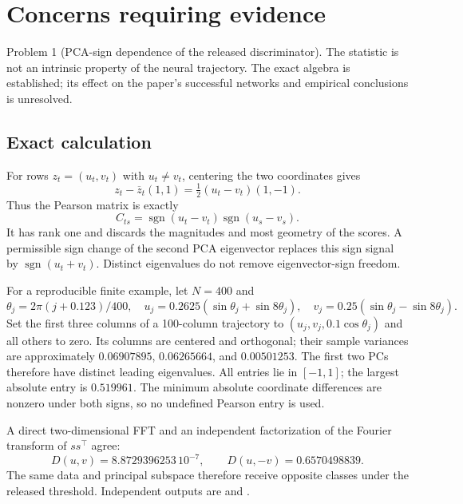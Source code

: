 \documentclass[10pt]{article}
\begin{document}
\section*{Concerns requiring evidence}
Problem 1 (PCA-sign dependence of the released discriminator).  The statistic is not an intrinsic property of the neural trajectory. The exact algebra is established; its effect on the paper’s successful networks and empirical conclusions is unresolved.\par
\subsection*{Exact calculation}
For rows \(z_t=(u_t,v_t)\) with \(u_t\ne v_t\), centering the two coordinates gives \[z_t-\overline z_t(1,1)
=\tfrac12(u_t-v_t)(1,-1).\] Thus the Pearson matrix is exactly \[C_{ts}=\operatorname{sgn}(u_t-v_t)
        \operatorname{sgn}(u_s-v_s).\] It has rank one and discards the magnitudes and most geometry of the scores. A permissible sign change of the second PCA eigenvector replaces this sign signal by \(\operatorname{sgn}(u_t+v_t)\). Distinct eigenvalues do not remove eigenvector-sign freedom.\par
For a reproducible finite example, let \(N=400\) and \[\theta_j=2\pi(j+0.123)/400,\quad
u_j=0.2625(\sin\theta_j+\sin8\theta_j),\quad
v_j=0.25(\sin\theta_j-\sin8\theta_j).\] Set the first three columns of a 100-column trajectory to \((u_j,v_j,0.1\cos\theta_j)\) and all others to zero. Its columns are centered and orthogonal; their sample variances are approximately \(0.06907895\), \(0.06265664\), and \(0.00501253\). The first two PCs therefore have distinct leading eigenvalues. All entries lie in \([-1,1]\); the largest absolute entry is \(0.519961\). The minimum absolute coordinate differences are nonzero under both signs, so no undefined Pearson entry is used.\par
A direct two-dimensional FFT and an independent factorization of the Fourier transform of \(ss^\top\) agree: \[D(u,v)=8.8729396253\,10^{-7},\qquad
D(u,-v)=0.6570498839.\] The same data and principal subspace therefore receive opposite classes under the released threshold. Independent outputs are and .\par
\end{document}
